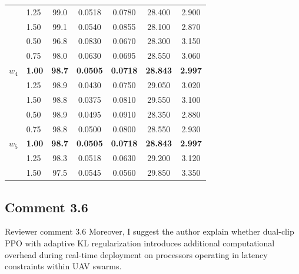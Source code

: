 \documentclass[11pt]{article}
\begin{document}
\begin{table}[h]
\begin{tabular}{llccccc}
 & 1.25          & 99.0          & 0.0518          & 0.0780          & 28.400          & 2.900 \\
 & 1.50          & 99.1          & 0.0540          & 0.0855          & 28.100          & 2.870 \\ \hline
\multirow{5}{*}{$w_4$}
 & 0.50          & 96.8          & 0.0830          & 0.0670          & 28.300          & 3.150 \\
 & 0.75          & 98.0          & 0.0630          & 0.0695          & 28.550          & 3.060 \\
 & \textbf{1.00} & \textbf{98.7} & \textbf{0.0505} & \textbf{0.0718} & \textbf{28.843} & \textbf{2.997} \\
 & 1.25          & 98.9          & 0.0430          & 0.0750          & 29.050          & 3.020 \\
 & 1.50          & 98.8          & 0.0375          & 0.0810          & 29.550          & 3.100 \\ \hline
\multirow{5}{*}{$w_5$}
 & 0.50          & 98.9          & 0.0495          & 0.0910          & 28.350          & 2.880 \\
 & 0.75          & 98.8          & 0.0500          & 0.0800          & 28.550          & 2.930 \\
 & \textbf{1.00} & \textbf{98.7} & \textbf{0.0505} & \textbf{0.0718} & \textbf{28.843} & \textbf{2.997} \\
 & 1.25          & 98.3          & 0.0518          & 0.0630          & 29.200          & 3.120 \\
 & 1.50          & 97.5          & 0.0545          & 0.0560          & 29.850          & 3.350 \\
\hline
\end{tabular}
\end{table}


\subsection*{Comment 3.6}

\begin{reviewercomment}{Reviewer comment 3.6}
Moreover, I suggest the author explain whether dual-clip PPO with adaptive KL
regularization introduces additional computational overhead during real-time
deployment on processors operating in latency constraints within UAV swarms.
\end{reviewercomment}
\end{document}
